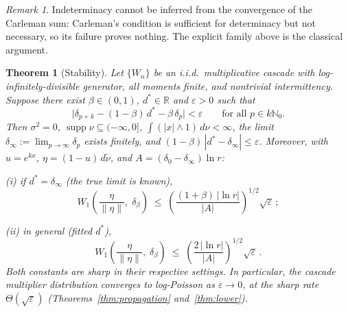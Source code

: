 \documentclass[12pt]{amsart}
\newtheorem{theorem}{Theorem}
\theoremstyle{definition}
\theoremstyle{remark}
\newtheorem*{remark}{Remark}
\DeclareMathOperator{\supp}{supp}
\begin{document}
\begin{remark}
Indeterminacy cannot be inferred from the convergence of the
Carleman sum: Carleman's condition is sufficient for determinacy but
not necessary, so its failure proves nothing.  The explicit family
above is the classical argument.
\end{remark}


\begin{theorem}[Stability]\label{thm:stability}
Let $\{W_n\}$ be an i.i.d.\ multiplicative cascade with
log-infinitely-divisible generator, all moments finite, and
nontrivial intermittency.  Suppose there exist $\beta \in (0,1)$,
$d^* \in \mathbb{R}$ and $\varepsilon > 0$ such that
\[
  \bigl|\delta_{p+k} - (1-\beta)\,d^* - \beta\,\delta_p\bigr|
  < \varepsilon
  \qquad\text{for all } p \in k\mathbb{N}_0 .
\]
Then $\sigma^2 = 0$, $\supp\nu \subseteq (-\infty,0]$,
$\int(|x|\wedge1)\,d\nu < \infty$, the limit $\delta_\infty :=
\lim_{p\to\infty}\delta_p$ exists finitely, and
$(1-\beta)\,|d^* - \delta_\infty| \le \varepsilon$.  Moreover, with
$u = e^{kx}$, $\eta = (1-u)\,d\tilde\nu$, and
$A = (\delta_0 - \delta_\infty)\ln r$:

\textup{(i)} if $d^* = \delta_\infty$ (the true limit is known),
\[
  W_1\!\left(\frac{\eta}{\|\eta\|},\;\delta_\beta\right)
  \;\leq\;
  \left(\frac{(1+\beta)\,|\ln r|}{|A|}\right)^{\!1/2}
  \!\sqrt{\varepsilon}\,;
\]

\textup{(ii)} in general (fitted $d^*$),
\[
  W_1\!\left(\frac{\eta}{\|\eta\|},\;\delta_\beta\right)
  \;\leq\;
  \left(\frac{2\,|\ln r|}{|A|}\right)^{\!1/2}
  \!\sqrt{\varepsilon}\,.
\]
Both constants are sharp in their respective settings.  In
particular, the cascade multiplier distribution converges to
log-Poisson as $\varepsilon \to 0$, at the sharp rate
$\Theta(\sqrt\varepsilon)$
(Theorems~\ref{thm:propagation} and~\ref{thm:lower}).
\end{theorem}
\end{document}
